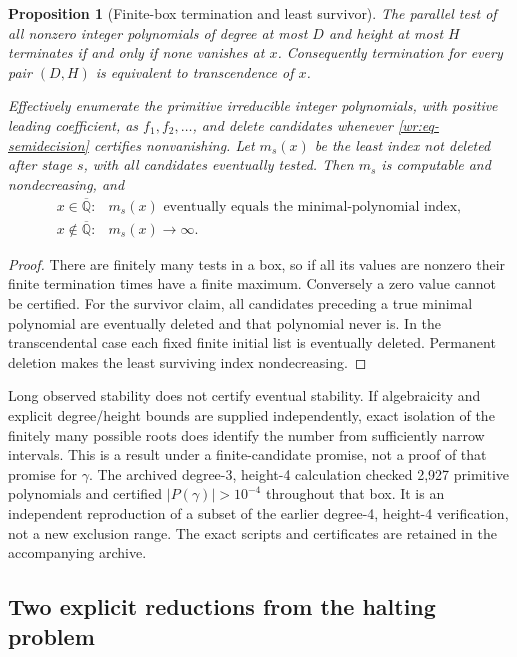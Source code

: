 \documentclass[11pt,a4paper]{article}
\newcommand{\Qbar}{\overline{\mathbb Q}}
\newtheorem{proposition}[theorem]{Proposition}
\theoremstyle{definition}
\theoremstyle{remark}
\numberwithin{equation}{section}
\begin{document}
\begin{proposition}[Finite-box termination and least survivor]
\label{wr:prop-survivor}
The parallel test of all nonzero integer polynomials of degree at most
\(D\) and height at most \(H\) terminates if and only if none vanishes
at \(x\). Consequently termination for every pair \((D,H)\) is
equivalent to transcendence of \(x\).

Effectively enumerate the primitive irreducible integer polynomials,
with positive leading coefficient, as \(f_1,f_2,\ldots\), and delete
candidates whenever \eqref{wr:eq-semidecision} certifies nonvanishing.
Let \(m_s(x)\) be the least index not deleted after stage \(s\), with
all candidates eventually tested. Then \(m_s\) is computable and
nondecreasing, and
\[
 \begin{array}{ll}
 x\in\Qbar:&m_s(x)\text{ eventually equals the minimal-polynomial index},\\
 x\notin\Qbar:&m_s(x)\longrightarrow\infty.
 \end{array}
\]
\end{proposition}
\begin{proof}
There are finitely many tests in a box, so if all its values are
nonzero their finite termination times have a finite maximum.
Conversely a zero value cannot be certified. For the survivor claim,
all candidates preceding a true minimal polynomial are eventually
deleted and that polynomial never is. In the transcendental case each
fixed finite initial list is eventually deleted. Permanent deletion
makes the least surviving index nondecreasing.
\end{proof}

Long observed stability does not certify eventual stability. If
algebraicity and explicit degree/height bounds are supplied independently,
exact isolation of the finitely many possible roots does identify the
number from sufficiently narrow intervals. This is a result under a
finite-candidate promise, not a proof of that promise for \(\gamma\).
The archived degree-3, height-4 calculation checked 2,927 primitive
polynomials and certified \(|P(\gamma)|>10^{-4}\) throughout that box.
It is an independent reproduction of a subset of the earlier degree-4,
height-4 verification, not a new exclusion range. The exact scripts and
certificates are retained in the accompanying archive.

\subsection{Two explicit reductions from the halting problem}
\end{document}
